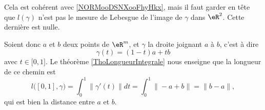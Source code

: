 \begin{remark}  \label{RemLongIntUn}
    Cela est cohérent avec \ref{NORMooDSNXooFhyHkx}, mais il faut garder en tête que \( l(\gamma)\) n'est pas le mesure de Lebesgue de l'image de \( \gamma\) dans \( \eR^2\). Cette dernière est nulle.
\end{remark}

\begin{example}
Soient donc $a$ et $b$ deux points de $\eR^m$, et $\gamma$ la droite joignant $a$ à $b$, c'est à dire
\begin{equation}
    \gamma(t)=(1-t)a+tb
\end{equation}
avec $t\in\mathopen[ 0 , 1 \mathclose]$. Le théorème \ref{ThoLongueurIntegrale} nous enseigne que la longueur de ce chemin est
\begin{equation}
    l\big( [0,1],\gamma \big)=\int_0^1\| \gamma'(t) \|dt=\int_0^1\| -a+b \|=\| b-a \|,
\end{equation}
qui est bien la distance entre $a$ et $b$.
\end{example}

